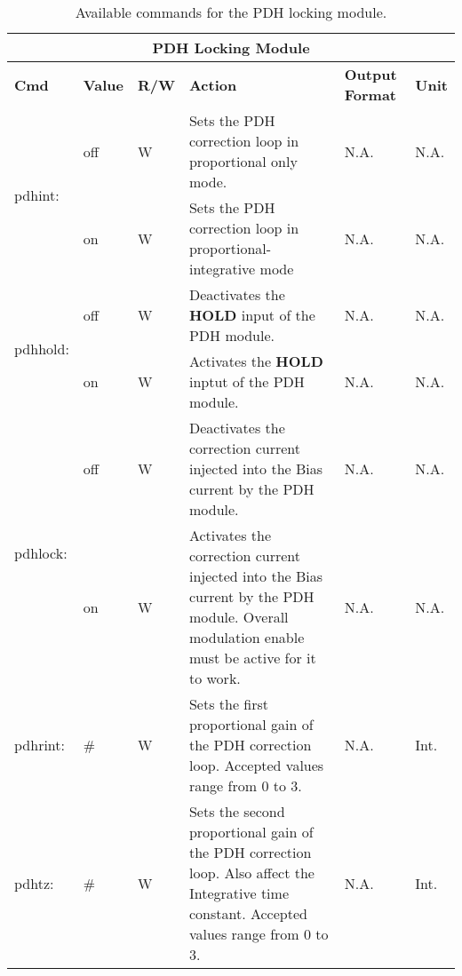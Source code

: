 \begin{center}
    \begin{longtable}{| m{} | m{} | m{} | m{} | m{}| m{} |}
    \caption{Available commands for the PDH locking module.\label{\QubeModel _cmd_table_pdh}}\\
    \hline
    \multicolumn{6}{|c|}{\textbf{PDH Locking Module}} \\
    \hline \hline    
    \textbf{Cmd} & \textbf{Value} & \textbf{R/W} & \textbf{Action} & \textbf{Output \newline Format} & \textbf{Unit} \\
    \hline
    
    \multirow{2}{0.1\textwidth}{pdhint:}    & off & W & Sets the PDH correction loop in proportional only mode. & N.A. & N.A. \\
                                            \cline{2-6}
                                            & on & W & Sets the PDH correction loop in proportional-integrative mode & N.A. & N.A.\\
    \hline
    
    \multirow{2}{0.1\textwidth}{pdhhold:}    & off & W & Deactivates the \textbf{HOLD} input of the PDH module. & N.A. & N.A. \\
                                            \cline{2-6}
                                            & on & W & Activates the \textbf{HOLD} inptut of the PDH module. & N.A. & N.A.\\
    \hline
    
    \multirow{2}{0.1\textwidth}{pdhlock:}    & off & W & Deactivates the correction current injected into the Bias current by the PDH module. & N.A. & N.A. \\
                                            \cline{2-6}
                                            & on & W & Activates the correction current injected into the Bias current by the PDH module. Overall modulation enable must be active for it to work. & N.A. & N.A.\\
    \hline
    
    pdhrint: & \# & W & Sets the first proportional gain of the PDH correction loop. Accepted values range from 0 to 3. & N.A. & Int. \\
    \hline
    
    pdhtz: & \# & W & Sets the second proportional gain of the PDH correction loop. Also affect the Integrative time constant. Accepted values range from 0 to 3. & N.A. & Int. \\
    \hline
    

\end{longtable}
\end{center}
